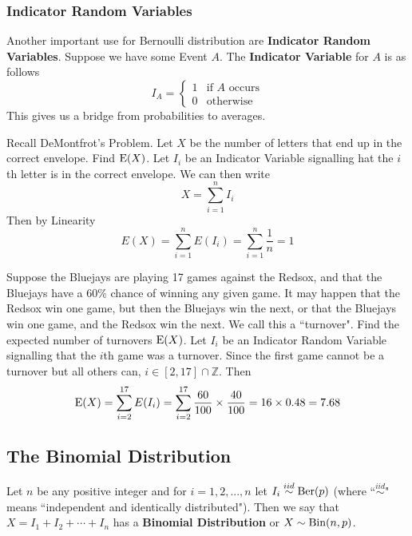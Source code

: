 \subsubsection{Indicator Random Variables}
Another important use for Bernoulli distribution are \textbf{Indicator Random Variables}. Suppose we have some Event $A$. The \textbf{Indicator Variable} for $A$ is as follows
\[
    I_A=\begin{cases}
        1 & \text{if $A$ occurs}\\
        0 & \text{otherwise}
    \end{cases}
\]
This gives us a bridge from probabilities to averages.
\begin{example}
    Recall DeMontfrot's Problem. Let $X$ be the number of letters that end up in the correct envelope. Find $\textup{E}(X)$.
    \solution
    Let $I_i$ be an Indicator Variable signalling hat the $i$th letter is in the correct envelope. We can then write
    \[
        X=\sum_{i=1}^n I_i
    \]
    Then by Linearity
    \[
         E(X)=\sum_{i=1}^n E(I_i) = \sum_{i=1}^n \frac 1n = 1
    \]
\end{example}
\begin{example}
    Suppose the Bluejays are playing 17 games against the Redsox, and that the Bluejays have a 60\% chance of winning any given game. It may happen that the Redsox win one game, but then the Bluejays win the next, or that the Bluejays win one game, and the Redsox win the next. We call this a ``turnover". Find the expected number of turnovers $\textup{E}(X)$.
    \solution
    Let $I_i$ be an Indicator Random Variable signalling that the $i$th game was a turnover. Since the first game cannot be a turnover but all others can, $i\in[2,17]\cap\mathbb Z$. Then
    \[
        \textup{E}(X)=\sum_{i=2}^{17} E(I_i)=\sum_{i=2}^{17} \frac {60}{100} \times \frac{40}{100}=16\times 0.48 = 7.68
    \]
\end{example}

\subsection{The Binomial Distribution}
\newcommand{\simiid}{\overset{iid}\sim}
\newcommand{\bin}{\textup{Bin}}
Let $n$ be any positive integer and for $i=1,2,...,n$ let $I_i \simiid \ber(p)$ (where ``$\simiid$" means ``independent and identically distributed"). Then we say that $X=I_1+I_2+\cdots + I_n$ has a \textbf{Binomial Distribution} or $X\sim \bin(n,p)$.




